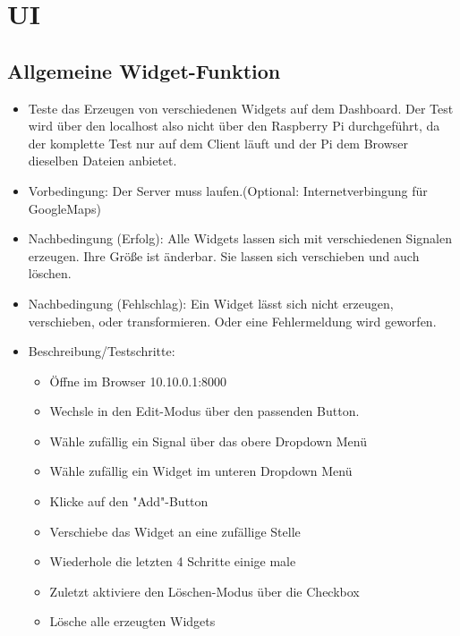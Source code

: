 \documentclass[qualitaetssicherung.tex]{subfiles}
\begin{document}
\section{UI}

	

	\subsection{Allgemeine Widget-Funktion}
		\begin{itemize}
			\item
			Teste das Erzeugen von verschiedenen Widgets auf dem Dashboard. Der Test wird über den localhost also nicht über den Raspberry Pi durchgeführt, da der komplette Test nur auf dem Client läuft und der Pi dem Browser dieselben Dateien anbietet.
			\item
			Vorbedingung: Der Server muss laufen.(Optional: Internetverbingung für GoogleMaps)
			\item
			Nachbedingung (Erfolg): Alle Widgets lassen sich mit verschiedenen Signalen erzeugen. Ihre Größe ist änderbar. Sie lassen sich verschieben und auch löschen. 
			\item
			Nachbedingung (Fehlschlag): Ein Widget lässt sich nicht erzeugen, verschieben, oder transformieren. Oder eine Fehlermeldung wird geworfen.
			\item
			Beschreibung/Testschritte:
			\begin{itemize}
				\item
				Öffne im Browser 10.10.0.1:8000
				\item
				Wechsle in den Edit-Modus über den passenden Button.
				\item
				Wähle zufällig ein Signal über das obere Dropdown Menü
				\item
				Wähle zufällig ein Widget im unteren Dropdown Menü
				\item
				Klicke auf den "Add"-Button
				\item
				Verschiebe das Widget an eine zufällige Stelle
				\item
				Wiederhole die letzten 4 Schritte einige male
				\item
				Zuletzt aktiviere den Löschen-Modus über die Checkbox
				\item
				Lösche alle erzeugten Widgets
			\end{itemize}
		\end{itemize}
		
\end{document}
